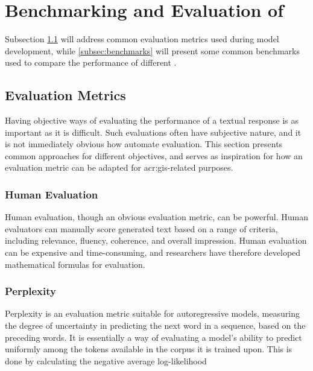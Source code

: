 \section[Benchmarking and Evaluation of LLMs]{Benchmarking and Evaluation of }\label{sec:benchmarking-and-evaluation}

Subsection \ref{subsec:evaluation-metrics} will address common evaluation metrics used during model development, while \autoref{subsec:benchmarks} will present some common benchmarks used to compare the performance of different .

\subsection{Evaluation Metrics}\label{subsec:evaluation-metrics}

Having objective ways of evaluating the performance of a textual response is as important as it is difficult. Such evaluations often have subjective nature, and it is not immediately obvious how automate evaluation. This section presents common approaches for different objectives, and serves as inspiration for how an evaluation metric can be adapted for \acrshort{acr:gis}-related purposes.

\subsubsection{Human Evaluation}

Human evaluation, though an obvious evaluation metric, can be powerful. Human evaluators can manually score generated text based on a range of criteria, including relevance, fluency, coherence, and overall impression. Human evaluation can be expensive and time-consuming, and researchers have therefore developed mathematical formulas for evaluation.

\subsubsection{Perplexity}

Perplexity is an evaluation metric suitable for autoregressive models, measuring the degree of uncertainty in predicting the next word in a sequence, based on the preceding words. It is essentially a way of evaluating a model's ability to predict uniformly among the tokens available in the corpus it is trained upon. This is done by calculating the negative average log-likelihood

